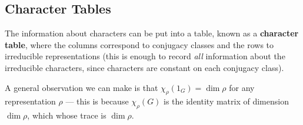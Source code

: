 \subsection{Character Tables}

The information about characters can be put into a table, known as a \textbf{character table}, where the columns correspond to conjugacy classes and the rows to irreducible representations (this is enough to record \emph{all} information about the irreducible characters, since characters are constant on each conjugacy class). 

A general observation we can make is that $\chi_\rho(1_G) = \dim \rho$ for any representation $\rho$ --- this is because $\chi_\rho(G)$ is the identity matrix of dimension $\dim \rho$, which whose trace is $\dim \rho$. 


